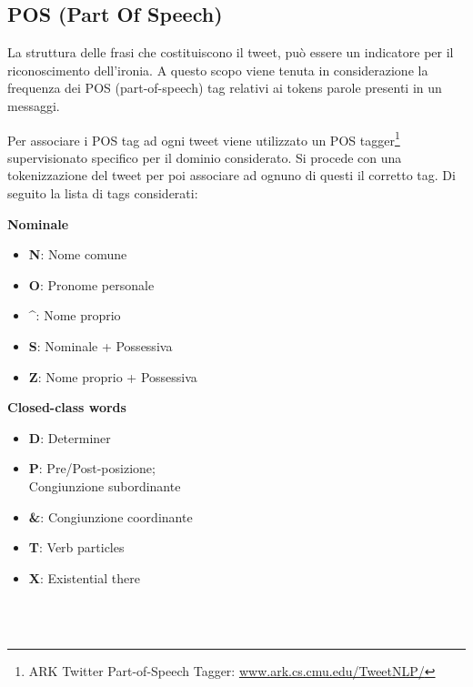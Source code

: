 \documentclass[oneside]{book}
\begin{document}
\subsection{POS (Part Of Speech)}
La struttura delle frasi che costituiscono il tweet, può essere un indicatore per il riconoscimento dell'ironia. A questo scopo viene tenuta in considerazione la frequenza dei POS (part-of-speech) tag relativi ai tokens parole presenti in un messaggi.

Per associare i POS tag ad ogni tweet viene utilizzato un POS tagger\footnote{ARK Twitter Part-of-Speech Tagger: \url{www.ark.cs.cmu.edu/TweetNLP/}} supervisionato specifico per il dominio considerato. Si procede con una tokenizzazione del tweet per poi associare ad ognuno di questi il corretto tag. Di seguito la lista di tags considerati:\\


\begin{varwidth}[t]{\textwidth}
	\textbf{Nominale}
	\begin{itemize}
		\item \textbf{N}: Nome comune
		\item \textbf{O}: Pronome personale
		\item \textbf{\^}: Nome proprio
		\item \textbf{S}: Nominale + Possessiva
		\item \textbf{Z}: Nome proprio + Possessiva
	\end{itemize}
\end{varwidth}
\hspace{4em}
\begin{varwidth}[t]{\textwidth}
	\textbf{Closed-class words}
	\begin{itemize}
		\item \textbf{D}: Determiner
		\item \textbf{P}: Pre/Post-posizione;\\Congiunzione subordinante
		\item \textbf{\&}: Congiunzione coordinante
		\item \textbf{T}: Verb particles
		\item \textbf{X}: Existential there
	\end{itemize}
\end{varwidth}\\\\
\end{document}

